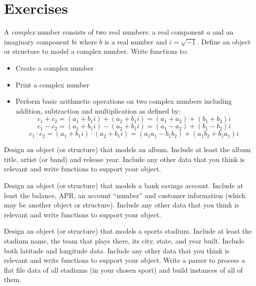 

\section{Exercises}

\begin{exer}
A \emph{complex} number consists of two real numbers: a real
component $a$ and an imaginary component $bi$ where $b$ is a real number and
$i = \sqrt{-1}$.  Define an object or structure to model a
complex number.  Write functions to:
\begin{itemize}
  \item Create a complex number
  \item Print a complex number
  \item Perform basic arithmetic operations on two complex
  	numbers including addition, subtraction and multiplication 
	as defined by:
	$$c_1 + c_2 = (a_1 + b_1i) + (a_2 + b_1i) = (a_1+a_2) + (b_1+b_2)i$$
	$$c_1 - c_2 = (a_1 + b_1i) - (a_2 + b_1i) = (a_1-a_2) + (b_1-b_2)i$$
	$$c_1 \cdot c_2 = (a_1 + b_1i) \cdot (a_2 + b_1i) = 
	  (a_1a_1-b_1b_2) + (a_1b_2+b_1a_1)i$$
\end{itemize}
\end{exer}

\begin{exer}
\label{exercise:albumObject}
Design an object (or structure) that models an album.  Include
at least the album title, artist (or band) and release year.
Include any other data that you think is relevant and write
functions to support your object.
\end{exer}

\begin{exer}
\label{exercise:accountObject}
Design an object (or structure) that models a bank savings account.
Include at least the balance, APR, an account ``number'' and 
customer information (which may be another object or structure).
Include any other data that you think is relevant and write
functions to support your object.
\end{exer}

\begin{exer}
\label{exercise:stadiumObject}
Design an object (or structure) that models a sports stadium.
Include at least the stadium name, the team that plays there, 
its city, state, and year built.  Include both latitude and
longitude data.  Include any other data that you think is relevant 
and write functions to support your object.  Write a parser to
process a flat file data of all stadiums (in your chosen sport) 
and build instances of all of them.
\end{exer}

